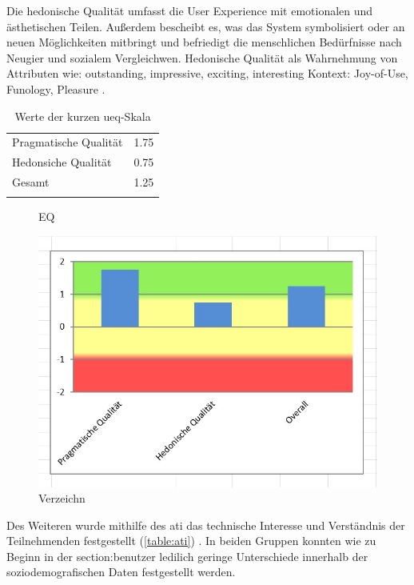 Die hedonische Qualität umfasst die User Experience mit emotionalen und ästhetischen Teilen.
Außerdem bescheibt es, was das System symbolisiert oder an neuen Möglichkeiten mitbringt und
befriedigt die menschlichen Bedürfnisse nach Neugier und sozialem Vergleichwen. Hedonische Qualität
als Wahrnehmung von Attributen wie: outstanding, impressive, exciting, interesting Kontext:
Joy-of-Use, Funology, Pleasure \cite{hassenzahl_thing_2004}.

\begin{table}[h]
  \centering
  \caption{Werte der kurzen \ac{ueq}-Skala}
  \begin{tabular}{lc}
    \arrayrulecolor{maincolor}\hline
    Pragmatische Qualität                         & 1.75 \\
    Hedonsiche Qualität             & 0.75 \\
    Gesamt            & 1.25 \\
    \arrayrulecolor{maincolor}\hline
  \end{tabular}
  \label{table:ueq}
\end{table}

\begin{figure}[h]
  \centering
  \caption{EQ}
  \includegraphics[scale=0.7]{Bilder/Screenshot 2022-10-26 165800.jpg}
  \caption[UEQ]{Verzeichn}
  \label{fig:ueq}
\end{figure}

Des Weiteren wurde mithilfe des \ac{ati} das technische Interesse und Verständnis der Teilnehmenden
festgestellt (\ref{table:ati}) \cite{attig_assessing_2017}. In beiden Gruppen konnten wie zu Beginn
in der \refname{section:benutzer} ledilich geringe Unterschiede innerhalb der soziodemografischen
Daten festgestellt werden. 

